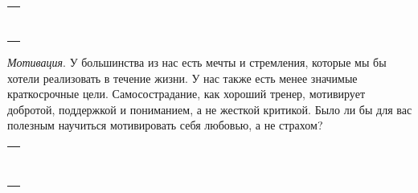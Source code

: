 \setlength{\extrarowheight}{2mm}
\begin{tabularx}{\textwidth}{X}
	\\
	\arrayrulecolor{gray}\hline\\
	\hline\\
	\hline\\
	\hline\\
	\hline\\
	\hline\\
	\hline\\
	\hline\\
\end{tabularx}
\setlength{\extrarowheight}{0mm}

\begin{itemize}
	\itemyinyang \textit{Мотивация}. У большинства из нас есть мечты и стремления, которые мы бы хотели реализовать в течение жизни. У нас также есть менее значимые краткосрочные цели. Самосострадание, как хороший тренер, мотивирует добротой, поддержкой и пониманием, а не жесткой критикой. Было ли бы для вас полезным научиться мотивировать себя любовью, а не страхом? 
\end{itemize}

\setlength{\extrarowheight}{2mm}
\begin{tabularx}{\textwidth}{X}
	\\
	\arrayrulecolor{gray}\hline\\
	\hline\\
	\hline\\
	\hline\\
	\hline\\
	\hline\\
	\hline\\
	\hline\\
	\hline\\
\end{tabularx}
\setlength{\extrarowheight}{0mm}



